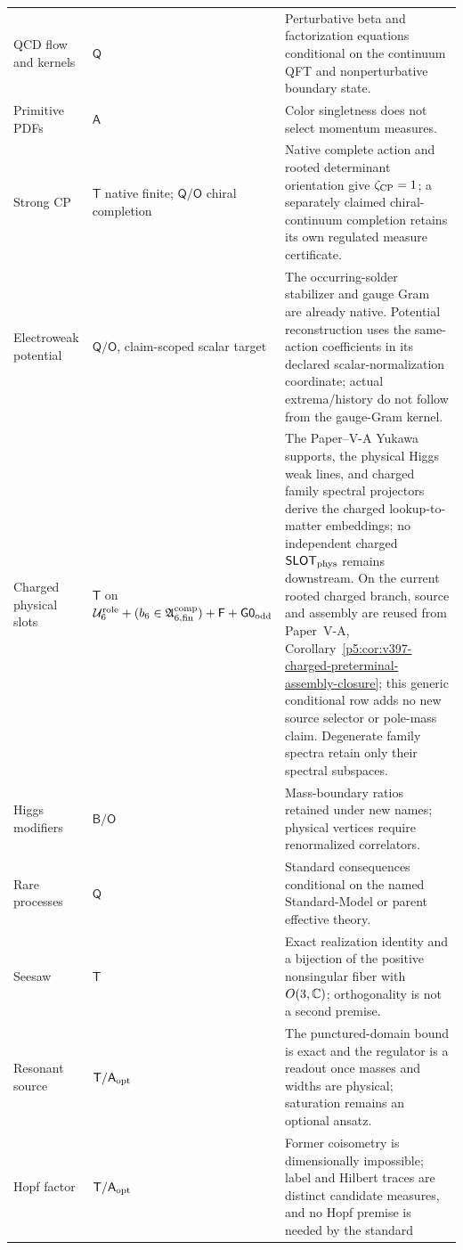 \documentclass[12pt,a4paper]{article}
\newcommand{\Urole}{\mathcal U_6^{\rm role}}
\newcommand{\Acompsix}{\mathfrak A_{6,{\rm fin}}^{\rm comp}}
\begin{document}
\begin{longtable}{@{}L{0.22\textwidth}L{0.17\textwidth}L{0.53\textwidth}@{}}
QCD flow and kernels
& \(\mathsf Q\)
& Perturbative beta and factorization equations conditional on the continuum
QFT and nonperturbative boundary state.\\
Primitive PDFs
& \(\mathsf A\)
& Color singletness does not select momentum measures.\\
Strong CP
& \(\mathsf T\) native finite; \(\mathsf Q/\mathsf O\) chiral completion
& Native complete action and rooted determinant orientation give
\(\zeta_{\rm CP}=1\); a separately claimed chiral-continuum completion
retains its own regulated measure certificate.\\
Electroweak potential
& \(\mathsf Q/\mathsf O\), claim-scoped scalar target
& The occurring-solder stabilizer and gauge Gram are already native.
Potential reconstruction uses the same-action coefficients in its declared
scalar-normalization coordinate; actual extrema/history do not follow from
the gauge-Gram kernel.\\
Charged physical slots
& \(\mathsf T\) on
  \(\Urole+(b_6\in\Acompsix)+\mathsf F+\mathsf{G0}_{\rm odd}\)
& The Paper--V-A Yukawa supports, the physical Higgs weak lines, and charged
family spectral projectors derive the charged lookup-to-matter embeddings;
no independent charged \(\mathsf{SLOT}_{\rm phys}\) remains downstream.
On the current rooted charged branch, source and assembly are reused from
Paper~V-A, Corollary~\ref{p5:cor:v397-charged-preterminal-assembly-closure};
this generic conditional row adds no new source selector or pole-mass claim.
Degenerate family spectra retain only their spectral subspaces.\\
Higgs modifiers
& \(\mathsf B/\mathsf O\)
& Mass-boundary ratios retained under new names; physical vertices require
renormalized correlators.\\
Rare processes
& \(\mathsf Q\)
& Standard consequences conditional on the named Standard-Model or parent
effective theory.\\
Seesaw
& \(\mathsf T\)
& Exact realization identity and a bijection of the positive nonsingular fiber
with \(O(3,\mathbb{C})\); orthogonality is not a second premise.\\
Resonant source
& \(\mathsf T/\mathsf A_{\rm opt}\)
& The punctured-domain bound is exact and the regulator is a readout once
masses and widths are physical; saturation remains an optional ansatz.\\
Hopf factor
& \(\mathsf T/\mathsf A_{\rm opt}\)
& Former coisometry is dimensionally impossible; label and Hilbert traces are
distinct candidate measures, and no Hopf premise is needed by the standard

\end{longtable}
\end{document}
